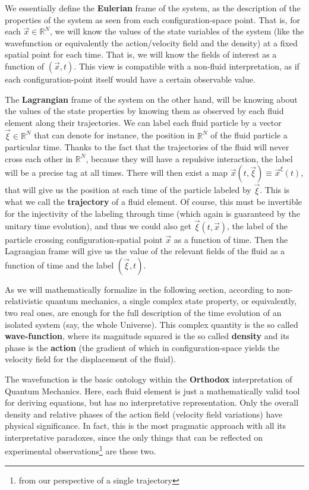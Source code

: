 \documentclass[11pt, a4paper]{article} %
\newcommand{\R}{\mathbb{R}} %
\begin{document}
We essentially define the {\bf Eulerian} frame of the system, as the description of the properties of the system as seen from each configuration-space point. That is, for each $\vec{x}\in\R^N$, we will know the values of the state variables of the system (like the wavefunction or equivalently the action/velocity field and the density) at a fixed spatial point for each time. That is, we will know the fields of interest as a function of $(\vec{x},t)$. This view is compatible with a non-fluid interpretation, as if each configuration-point itself would have a certain observable value. 

The {\bf Lagrangian} frame of the system on the other hand, will be knowing about the values of the state properties by knowing them as observed by each fluid element along their trajectories. We can label each fluid particle by a vector $\vec{\xi}\in \R^N$ that can denote for instance, the position in $\R^N$ of the fluid particle a particular time. Thanks to the fact that the trajectories of the fluid will never cross each other in $\R^N$, because they will have a repulsive interaction, the label will be a precise tag at all times. There will then exist a map $\vec{x}(t,\vec{\xi})\equiv \vec{x}^{\xi}(t)$, that will give us the position at each time of the particle labeled by $\vec{\xi}$. This is what we call the {\bf trajectory} of a fluid element. Of course, this must be invertible for the injectivity of the labeling through time (which again is guaranteed by the unitary time evolution), and thus we could also get $\vec{\xi}(t,\vec{x})$, the label of the particle crossing configuration-spatial point $\vec{x}$ as a function of time. Then the Lagrangian frame will give us the value of the relevant fields of the fluid as a function of time and the label $(\vec{\xi},t)$.
 
As we will mathematically formalize in the following section, according to non-relativistic quantum mechanics, a single complex state property, or equivalently, two real ones, are enough for the full description of the time evolution of an isolated system (say, the whole Universe). This complex quantity is the so called {\bf wave-function}, where its magnitude squared is the so called {\bf density} and its phase is the {\bf action} (the gradient of which in configuration-space yields the velocity field for the displacement of the fluid).

The wavefunction is the basic ontology within the {\bf Orthodox} interpretation of Quantum Mechanics. Here, each fluid element is just a mathematically valid tool for deriving equations, but has no interpretative representation. Only the overall density and relative phases of the action field (velocity field variations) have physical significance. In fact, this is the most pragmatic approach with all its interpretative paradoxes, since the only things that can be reflected on experimental observations\footnote{from our perspective of a single trajectory} are these two. 
\end{document}
